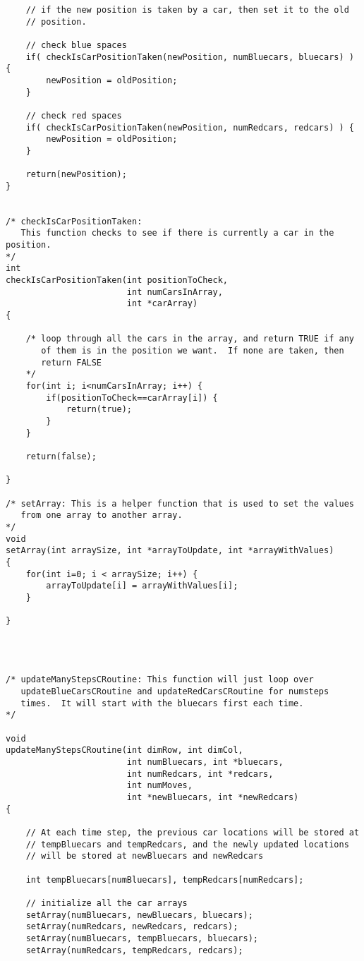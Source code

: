 \documentclass[11pt]{article}
\begin{document}
\begin{verbatim}
    // if the new position is taken by a car, then set it to the old
    // position.

    // check blue spaces
    if( checkIsCarPositionTaken(newPosition, numBluecars, bluecars) ) {
        newPosition = oldPosition;
    }

    // check red spaces
    if( checkIsCarPositionTaken(newPosition, numRedcars, redcars) ) {
        newPosition = oldPosition;
    }

    return(newPosition);
}


/* checkIsCarPositionTaken:
   This function checks to see if there is currently a car in the position.
*/
int
checkIsCarPositionTaken(int positionToCheck,
                        int numCarsInArray,
                        int *carArray)
{

    /* loop through all the cars in the array, and return TRUE if any
       of them is in the position we want.  If none are taken, then
       return FALSE 
    */ 
    for(int i; i<numCarsInArray; i++) {
        if(positionToCheck==carArray[i]) {
            return(true);
        }
    }

    return(false);

}

/* setArray: This is a helper function that is used to set the values
   from one array to another array.
*/
void 
setArray(int arraySize, int *arrayToUpdate, int *arrayWithValues) 
{ 
    for(int i=0; i < arraySize; i++) {
        arrayToUpdate[i] = arrayWithValues[i];
    }

}




/* updateManyStepsCRoutine: This function will just loop over
   updateBlueCarsCRoutine and updateRedCarsCRoutine for numsteps
   times.  It will start with the bluecars first each time.
*/

void
updateManyStepsCRoutine(int dimRow, int dimCol,
                        int numBluecars, int *bluecars,
                        int numRedcars, int *redcars,
                        int numMoves,
                        int *newBluecars, int *newRedcars)
{

    // At each time step, the previous car locations will be stored at
    // tempBluecars and tempRedcars, and the newly updated locations
    // will be stored at newBluecars and newRedcars

    int tempBluecars[numBluecars], tempRedcars[numRedcars];

    // initialize all the car arrays
    setArray(numBluecars, newBluecars, bluecars);
    setArray(numRedcars, newRedcars, redcars);
    setArray(numBluecars, tempBluecars, bluecars);
    setArray(numRedcars, tempRedcars, redcars);


\end{verbatim}
\end{document}
